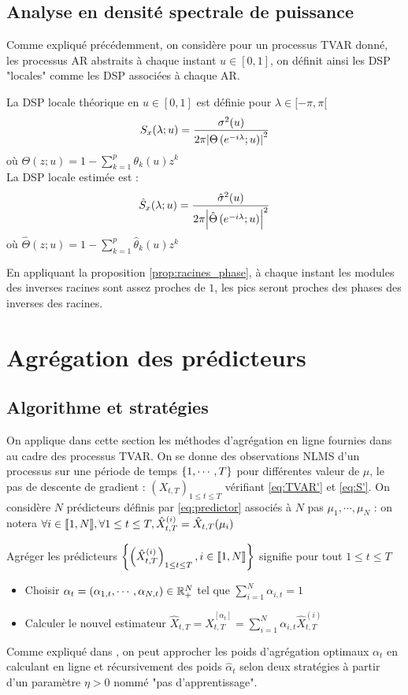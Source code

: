 \documentclass{report}
\begin{document}
\subsection{Analyse en densité spectrale de puissance}
Comme expliqué précédemment, on considère pour un processus TVAR donné, les processus AR abstraits à chaque instant $u\in [0,1]$, on définit ainsi les DSP "locales" comme les DSP associées à chaque AR.
\begin{Def}[DSP]
La DSP locale théorique en $u\in [0,1]$ est définie pour $\lambda \in [-\pi, \pi[$ 
$$
S_x(\lambda ; u) = \frac{\sigma^2(u)}{2\pi{ \left| \Theta\left( e^{-i\lambda} ; u \right) \right|}^2}
$$
où $\Theta(z;u) = 1 - \sum_{k=1}^p \theta_k(u) z^k$ \\
La DSP locale estimée est : 
$$
\hat{S}_x(\lambda ; u) = \frac{\hat{\sigma}^2(u)}{2\pi{ \left| \hat{\Theta}\left( e^{-i\lambda} ; u \right) \right|}^2}
$$
où $\hat{\Theta}(z;u) = 1 - \sum_{k=1}^p \hat{\theta}_k(u) z^k$
\end{Def}

En appliquant la proposition \ref{prop:racines_phase}, à chaque instant les modules des inverses racines sont assez proches de $1$, les pics seront proches des phases des inverses des racines.
\section{Agrégation des prédicteurs}
\subsection{Algorithme et stratégies}
On applique dans cette section les méthodes d'agrégation en ligne fournies dans \citep{giraud-roueff-sanchez-aos2015} au cadre des processus TVAR. On se donne des observations NLMS d'un processus sur une période de temps ${ \left\lbrace 1,\cdots,T \right\rbrace }$ pour différentes valeur de $\mu$, le pas de descente de gradient :  $(X_{t,T})_{1 \leq t \leq T}$ vérifiant \eqref{eq:TVAR'} et \eqref{eq:S'}. On considère $N$ prédicteurs définis par \eqref{eq:predictor} associés à $N$ pas $\mu_1, \cdots, \mu_N$ : on notera $\forall i \in { \left\llbracket 1,N \right\rrbracket}, \forall 1\leq t \leq T, \hat{X}_{t,T}^{(i)} = \hat{X}_{t,T}(\mu_i)$
\begin{Def}[Agrégation]
Agréger les prédicteurs ${ \left\lbrace \left(\hat{X}_{t,T}^{(i)}\right)_{1\leq t\leq T}, i\in { \left\llbracket 1,N \right\rrbracket} \right\rbrace }$ signifie pour tout $1\leq t \leq T$
\begin{itemize}
\item Choisir $\alpha_t=(\alpha_{1,t},\cdots,\alpha_{N,t}) \in \mathbb{R}_+^N$ tel que $\sum_{i=1}^N \alpha_{i,t} = 1$ 
\item Calculer le nouvel estimateur $\hat{X}_{t,T} = \hat{X}_{t,T}^{[\alpha_t]} = \sum_{i=1}^N \alpha_{i,t} \hat{X}_{t,T}^{(i)}$
\end{itemize}
\end{Def}
Comme expliqué dans \citep{giraud-roueff-sanchez-aos2015}, on peut approcher les poids d'agrégation optimaux $\alpha_t$ en calculant en ligne et récursivement des poids $\hat{\alpha}_t$ selon deux stratégies à partir d'un paramètre $\eta >0$ nommé "pas d'apprentissage". \\
\end{document}
